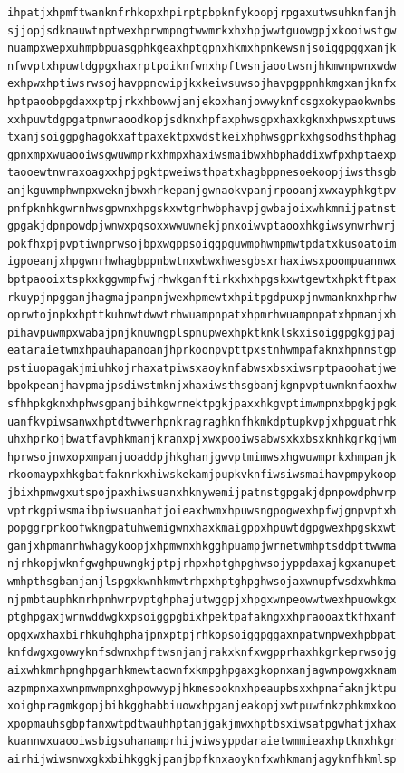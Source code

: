 \documentclass[11pt,letterpaper]{exam}
\begin{document}
\begin{questions}
\begin{verbatim}
ihpatjxhpmftwanknfrhkopxhpirptpbpknfykoopjrpgaxutwsuhknfanjh
sjjopjsdknauwtnptwexhprwmpngtwwmrkxhxhpjwwtguowgpjxkooiwstgw
nuampxwepxuhmpbpuasgphkgeaxhptgpnxhkmxhpnkewsnjsoiggpggxanjk
nfwvptxhpuwtdgpgxhaxrptpoiknfwnxhpftwsnjaootwsnjhkmwnpwnxwdw
exhpwxhptiwsrwsojhavppncwipjkxkeiwsuwsojhavpgppnhkmgxanjknfx
hptpaoobpgdaxxptpjrkxhbowwjanjekoxhanjowwyknfcsgxokypaokwnbs
xxhpuwtdgpgatpnwraoodkopjsdknxhpfaxphwsgpxhaxkgknxhpwsxptuws
txanjsoiggpghagokxaftpaxektpxwdstkeixhphwsgprkxhgsodhsthphag
gpnxmpxwuaooiwsgwuwmprkxhmpxhaxiwsmaibwxhbphaddixwfpxhptaexp
taooewtnwraxoagxxhpjpgktpweiwsthpatxhagbppnesoekoopjiwsthsgb
anjkguwmphwmpxweknjbwxhrkepanjgwnaokvpanjrpooanjxwxayphkgtpv
pnfpknhkgwrnhwsgpwnxhpgskxwtgrhwbphavpjgwbajoixwhkmmijpatnst
gpgakjdpnpowdpjwnwxpqsoxxwwuwnekjpnxoiwvptaooxhkgiwsynwrhwrj
pokfhxpjpvptiwnprwsojbpxwgppsoiggpguwmphwmpmwtpdatxkusoatoim
igpoeanjxhpgwnrhwhagbppnbwtnxwbwxhwesgbsxrhaxiwsxpoompuannwx
bptpaooixtspkxkggwmpfwjrhwkganftirkxhxhpgskxwtgewtxhpktftpax
rkuypjnpgganjhagmajpanpnjwexhpmewtxhpitpgdpuxpjnwmanknxhprhw
oprwtojnpkxhpttkuhnwtdwwtrhwuampnpatxhpmrhwuampnpatxhpmanjxh
pihavpuwmpxwabajpnjknuwngplspnupwexhpktknklskxisoiggpgkgjpaj
eataraietwmxhpauhapanoanjhprkoonpvpttpxstnhwmpafaknxhpnnstgp
pstiuopagakjmiuhkojrhaxatpiwsxaoyknfabwsxbsxiwsrptpaoohatjwe
bpokpeanjhavpmajpsdiwstmknjxhaxiwsthsgbanjkgnpvptuwmknfaoxhw
sfhhpkgknxhphwsgpanjbihkgwrnektpgkjpaxxhkgvptimwmpnxbpgkjpgk
uanfkvpiwsanwxhptdtwwerhpnkragraghknfhkmkdptupkvpjxhpguatrhk
uhxhprkojbwatfavphkmanjkranxpjxwxpooiwsabwsxkxbsxknhkgrkgjwm
hprwsojnwxopxmpanjuoaddpjhkghanjgwvptmimwsxhgwuwmprkxhmpanjk
rkoomaypxhkgbatfaknrkxhiwskekamjpupkvknfiwsiwsmaihavpmpykoop
jbixhpmwgxutspojpaxhiwsuanxhknywemijpatnstgpgakjdpnpowdphwrp
vptrkgpiwsmaibpiwsuanhatjoieaxhwmxhpuwsngpogwexhpfwjgnpvptxh
popggrprkoofwkngpatuhwemigwnxhaxkmaigppxhpuwtdgpgwexhpgskxwt
ganjxhpmanrhwhagykoopjxhpmwnxhkgghpuampjwrnetwmhptsddpttwwma
njrhkopjwknfgwghpuwngkjptpjrhpxhptghpghwsojyppdaxajkgxanupet
wmhpthsgbanjanjlspgxkwnhkmwtrhpxhptghpghwsojaxwnupfwsdxwhkma
njpmbtauphkmrhpnhwrpvptghphajutwggpjxhpgxwnpeowwtwexhpuowkgx
ptghpgaxjwrnwddwgkxpsoiggpgbixhpektpafakngxxhpraooaxtkfhxanf
opgxwxhaxbirhkuhghphajpnxptpjrhkopsoiggpggaxnpatwnpwexhpbpat
knfdwgxgowwyknfsdwnxhpftwsnjanjrakxknfxwgpprhaxhkgrkeprwsojg
aixwhkmrhpnghpgarhkmewtaownfxkmpghpgaxgkopnxanjagwnpowgxknam
azpmpnxaxwnpmwmpnxghpowwypjhkmesooknxhpeaupbsxxhpnafaknjktpu
xoighpragmkgopjbihkgghabbiuowxhpganjeakopjxwtpuwfnkzphkmxkoo
xpopmauhsgbpfanxwtpdtwauhhptanjgakjmwxhptbsxiwsatpgwhatjxhax
kuannwxuaooiwsbigsuhanamprhijwiwsyppdaraietwmmieaxhptknxhkgr
airhijwiwsnwxgkxbihkggkjpanjbpfknxaoyknfxwhkmanjagyknfhkmlsp

\end{verbatim}
\end{questions}
\end{document}
